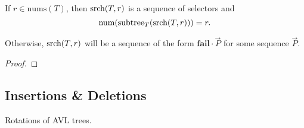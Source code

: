 \begin{theorem}
If $r \in \text{nums}(T)$, then $\text{srch}(T,r)$ is a sequence of
selectors and
\[
\text{num}(\text{subtree}_{T}(\text{srch}(T,r))) = r.
\]

Otherwise, $\text{srch}(T,r)$ will be a sequence of the form
$\textbf{fail}\cdot \vec{P}$ for some sequence $\vec{P}$.
\end{theorem}

\begin{proof}


\end{proof}

\subsection{Insertions \& Deletions}

Rotations of AVL trees.


  \endinput
